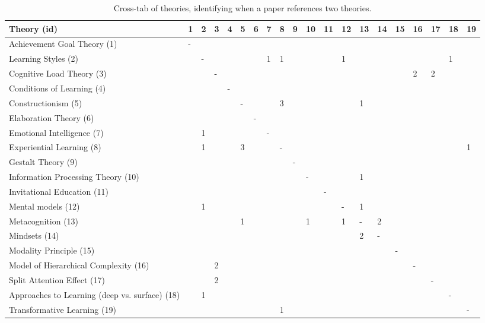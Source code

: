 \begin{table*}[t]
\begin{tabular}{llllllllllllllllllll}
Theory (id) & 1&2&3&4&5&6&7&8&9&10&11&12&13&14&15&16&17&18&19\\\hline
Achievement Goal Theory (1) & -&&&&&&&&&&&&&&&&&&\\
Learning Styles (2) & &-&&&&&1&1&&&&1&&&&&&1&\\
Cognitive Load Theory (3) & &&-&&&&&&&&&&&&&2&2&&\\
Conditions of Learning (4) & &&&-&&&&&&&&&&&&&&&\\
Constructionism (5) & &&&&-&&&3&&&&&1&&&&&&\\
Elaboration Theory (6) & &&&&&-&&&&&&&&&&&&&\\
Emotional Intelligence (7) & &1&&&&&-&&&&&&&&&&&&\\
Experiential Learning (8) & &1&&&3&&&-&&&&&&&&&&&1\\
Gestalt Theory (9) & &&&&&&&&-&&&&&&&&&&\\
Information Processing Theory (10) & &&&&&&&&&-&&&1&&&&&&\\
Invitational Education (11) & &&&&&&&&&&-&&&&&&&&\\
Mental models (12) & &1&&&&&&&&&&-&1&&&&&&\\
Metacognition (13) & &&&&1&&&&&1&&1&-&2&&&&&\\
Mindsets (14) & &&&&&&&&&&&&2&-&&&&&\\
Modality Principle (15) & &&&&&&&&&&&&&&-&&&&\\
Model of Hierarchical Complexity (16) & &&2&&&&&&&&&&&&&-&&&\\
Split Attention Effect (17) & &&2&&&&&&&&&&&&&&-&&\\
Approaches to Learning (deep vs. surface) (18) & &1&&&&&&&&&&&&&&&&-&\\
Transformative Learning (19) & &&&&&&&1&&&&&&&&&&&-\\
\end{tabular}
\caption{Cross-tab of theories, identifying when a paper references two theories.}
\end{table*}